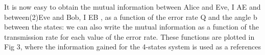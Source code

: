It is now easy to obtain the mutual information between Alice and Eve, I AE and between(2)Eve and Bob, I EB , as a function of the error rate Q and the angle b between the states: we can also write the mutual information as a function of the transmission rate for each value of the error rate. These functions are plotted in Fig 3, where the information gained for the 4-states system is used as a references 






\subsection*{\trnas}
\blindtext
\subsection*{\review}
\blindtext
\subsection*{\dic}
\blindtext